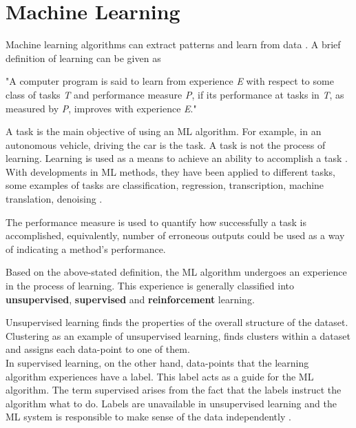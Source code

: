 \chapter{Machine Learning}
Machine learning algorithms can extract patterns and learn from data \cite{IanGoodfellow2016}. A brief definition of learning can be given as \cite{mitchell1997machine}
\begin{displayquote}[][]
    "A computer program is said to learn from experience \textit{E} with respect to some class of tasks \textit{T} and performance measure \textit{P}, if its performance at tasks in \textit{T}, as measured by \textit{P}, improves with experience \textit{E}."
\end{displayquote}

A task is the main objective of using an ML algorithm. For example, in an autonomous vehicle, driving the car is the task. A task is not the process of learning. Learning is used as a means to achieve an ability to accomplish a task \cite{IanGoodfellow2016}. With developments in ML methods, they have been applied to different tasks, some examples of tasks are classification, regression, transcription, machine translation, denoising \cite{IanGoodfellow2016}.

The performance measure is used to quantify how successfully a task is accomplished, equivalently, number of erroneous outputs could be used as a way of indicating a method's performance. 

Based on the above-stated definition, the ML algorithm undergoes an experience in the process of learning. This experience is generally classified into \textbf{unsupervised}, \textbf{supervised} and \textbf{reinforcement} learning.

Unsupervised learning finds the properties of the overall structure of the dataset. Clustering as an example of unsupervised learning, finds clusters within a dataset and assigns each data-point to one of them.\\In supervised learning, on the other hand, data-points that the learning algorithm experiences have a label. This label acts as a guide for the ML algorithm. The term supervised arises from the fact that the labels instruct the algorithm what to do. Labels are unavailable in unsupervised learning and the ML system is responsible to make sense of the data independently \cite{IanGoodfellow2016}. 

